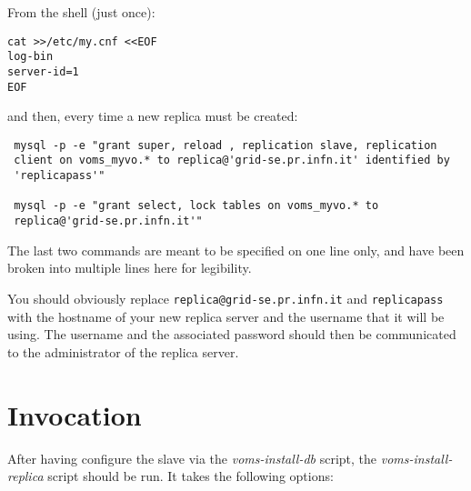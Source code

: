 \documentclass[a4paper]{book}
\begin{document}
From the shell (just once):

\begin{verbatim}
cat >>/etc/my.cnf <<EOF
log-bin
server-id=1
EOF
\end{verbatim}

and then, every time a new replica must be created:

\begin{verbatim}
 mysql -p -e "grant super, reload , replication slave, replication
 client on voms_myvo.* to replica@'grid-se.pr.infn.it' identified by
 'replicapass'"

 mysql -p -e "grant select, lock tables on voms_myvo.* to
 replica@'grid-se.pr.infn.it'"
\end{verbatim}

The last two commands are meant to be specified on one line only, and
have been broken into multiple lines here for legibility.

You should obviously replace \texttt{replica@grid-se.pr.infn.it} and
\texttt{replicapass}  with the hostname of your new replica server and
the username that it will be using.  The username and the associated
password should then be communicated to the administrator of the
replica server. 

\section{Invocation}
After having configure the slave via the \emph{voms-install-db}
script, the \emph{voms-install-replica} script should be run.  It
takes the following options:
\end{document}
